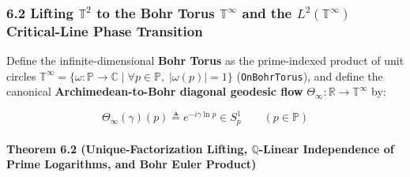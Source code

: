 \documentclass[
  11pt,
]{article}
\begin{document}
\subsubsection{\texorpdfstring{6.2 Lifting \(\mathbb{T}^2\) to the Bohr
Torus \(\mathbb{T}^\infty\) and the \(L^2(\mathbb{T}^\infty)\)
Critical-Line Phase
Transition}{6.2 Lifting \textbackslash mathbb\{T\}\^{}2 to the Bohr Torus \textbackslash mathbb\{T\}\^{}\textbackslash infty and the L\^{}2(\textbackslash mathbb\{T\}\^{}\textbackslash infty) Critical-Line Phase Transition}}\label{lifting-mathbbt2-to-the-bohr-torus-mathbbtinfty-and-the-l2mathbbtinfty-critical-line-phase-transition}

Define the infinite-dimensional \textbf{Bohr Torus} as the prime-indexed
product of unit circles
\(\mathbb{T}^\infty = \{\omega : \mathbb{P} \to \mathbb{C} \mid \forall p \in \mathbb{P},\; |\omega(p)| = 1\}\)
(\texttt{OnBohrTorus}), and define the canonical
\textbf{Archimedean-to-Bohr diagonal geodesic flow}
\(\Theta_\infty : \mathbb{R} \to \mathbb{T}^\infty\) by:

\[\Theta_\infty(\gamma)(p) \triangleq e^{-i\gamma \ln p} \in S^1_p \qquad (p \in \mathbb{P})\]

\paragraph{\texorpdfstring{Theorem 6.2 (Unique-Factorization Lifting,
\(\mathbb{Q}\)-Linear Independence of Prime Logarithms, and Bohr Euler
Product)}{Theorem 6.2 (Unique-Factorization Lifting, \textbackslash mathbb\{Q\}-Linear Independence of Prime Logarithms, and Bohr Euler Product)}}\label{theorem-6.2-unique-factorization-lifting-mathbbq-linear-independence-of-prime-logarithms-and-bohr-euler-product}
\end{document}
